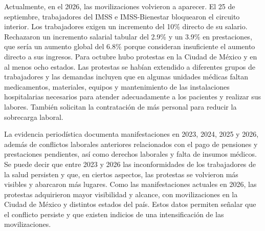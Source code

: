 \documentclass[12pt,letterpaper]{article}
\begin{document}
Actualmente, en el 2026, las movilizaciones volvieron a aparecer. El 25 de septiembre, trabajadores del IMSS e IMSS-Bienestar bloquearon el circuito interior. Los trabajadores exigen un incremento del 10\% directo de su salario. Rechazaron un incremento salarial tabular del 2.9\% y un 3.9\% en prestaciones, que sería un aumento global del 6.8\% porque consideran insuficiente el aumento directo a sus ingresos. Para octubre hubo protestas en la Ciudad de México y en al menos ocho estados. Las protestas se habían extendido a diferentes grupos de trabajadores y las demandas incluyen que en algunas unidades médicas faltan medicamentos, materiales, equipos y mantenimiento de las instalaciones hospitalarias necesarios para atender adecuadamente a los pacientes y realizar sus labores. También solicitan la contratación de más personal para reducir la sobrecarga laboral.

La evidencia periodística documenta manifestaciones en 2023, 2024, 2025 y 2026, además de conflictos laborales anteriores relacionados con el pago de pensiones y prestaciones pendientes, así como derechos laborales y falta de insumos médicos. Se puede decir que entre 2023 y 2026 las inconformidades de los trabajadores de la salud persisten y que, en ciertos aspectos, las protestas se volvieron más visibles y abarcaron más lugares. Como las manifestaciones actuales en 2026, las protestas adquirieron mayor visibilidad y alcance, con movilizaciones en la Ciudad de México y distintos estados del país. Estos datos permiten señalar que el conflicto persiste y que existen indicios de una intensificación de las movilizaciones.
\end{document}
